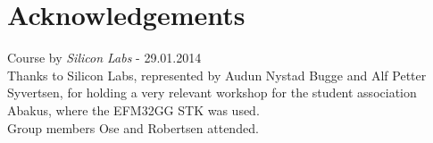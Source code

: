 \chapter{Acknowledgements}
Course by \textit{Silicon Labs} - 29.01.2014\\
Thanks to Silicon Labs, represented by Audun Nystad Bugge and Alf Petter Syvertsen, for holding a very relevant workshop for the student association Abakus, where the EFM32GG STK was used.\\
Group members Ose and Robertsen attended.
